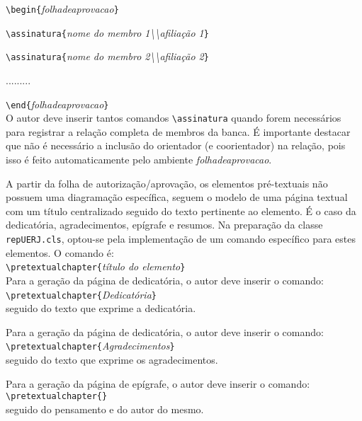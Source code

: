\documentclass[a4paper,12pt,oneside,onecolumn]{article}
\newcommand{\comando}[1]{\texttt{\textbackslash #1}}
\newcommand{\param}[1]{\texttt{\{}\textsl{#1}\texttt{\}}}
\begin{document}
\comando{begin}\param{folhadeaprovacao}

\comando{assinatura}\param{nome do membro 1\textbackslash\textbackslash afiliação 1}

\comando{assinatura}\param{nome do membro 2\textbackslash\textbackslash afiliação 2}

.........

\comando{end}\param{folhadeaprovacao}\\

O autor deve inserir tantos comandos \comando{assinatura} quando forem necessários para registrar a relação completa de membros da banca. É importante destacar que não é necessário a inclusão do orientador (e coorientador) na relação, pois isso é feito automaticamente pelo ambiente \textsl{folhadeaprovacao}.

A partir da folha de autorização/aprovação, os elementos pré-textuais não possuem uma diagramação específica, seguem o modelo de uma página textual com um título centralizado seguido do texto pertinente ao elemento. É o caso da dedicatória, agradecimentos, epígrafe e resumos. Na preparação da classe \texttt{repUERJ.cls}, optou-se pela implementação de um comando específico para estes elementos. O comando é:\\

\comando{pretextualchapter}\param{título do elemento}\\

Para a geração da página de dedicatória, o autor deve inserir o comando:\\

\comando{pretextualchapter}\param{Dedicatória}\\

\noindent seguido do texto que exprime a dedicatória.

Para a geração da página de dedicatória, o autor deve inserir o comando:\\

\comando{pretextualchapter}\param{Agradecimentos}\\

\noindent seguido do texto que exprime os agradecimentos.

Para a geração da página de epígrafe, o autor deve inserir o comando:\\

\comando{pretextualchapter}\param{}\\

\noindent seguido do pensamento e do autor do mesmo.
\end{document}
